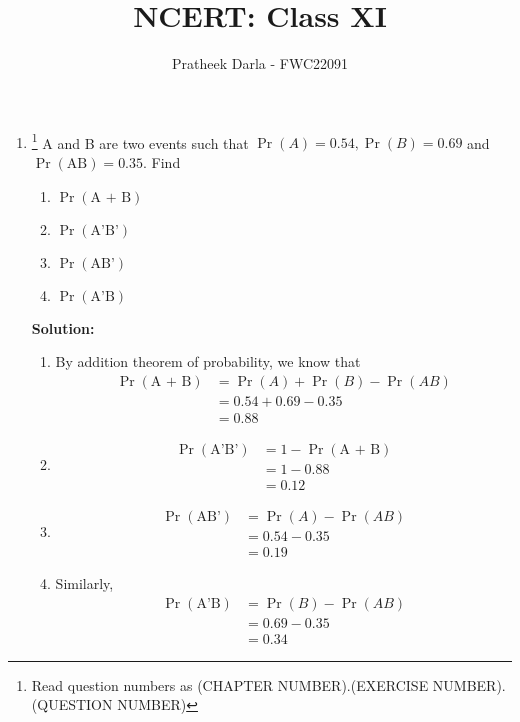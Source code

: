 \documentclass{article}
\providecommand{\pr}[1]{\ensuremath{\Pr\left(#1\right)}}
\newcommand{\solution}{\noindent \textbf{Solution: }}
\begin{document}
\title{NCERT: Class XI}
\author{\Large Pratheek Darla - FWC22091}
\date{}

\maketitle

\begin{enumerate}[label=16.\arabic{enumi}.\arabic{enumii}]%
\setcounter{enumi}{3}
\setcounter{enumii}{7}

\item \footnote{Read question numbers as (CHAPTER NUMBER).(EXERCISE NUMBER).(QUESTION NUMBER)} A and B are two events such that $\pr A=0.54, \pr B=0.69$ and  $\pr {\text{AB}} = 0.35$. Find\\[1ex]
\begin{enumerate}
\item $\pr{\text{A + B}}$ \\
\item $\pr{\text{A'B'}}$ \\
\item $\pr{\text{AB'}}$ \\
\item $\pr{\text{A'B}}$ \\[1ex]
\end{enumerate}

\solution 
\begin{enumerate}
\item By addition theorem of probability, we know that\\
\begin{align}
\pr{\text{A + B}} &= \pr A + \pr B - \pr {AB} \\
&= 0.54 + 0.69 - 0.35 \\
&= 0.88    
\end{align}

\item
\begin{align}
\pr{\text{A'B'}} &= 1 - \pr{\text{A + B}} \\
 &= 1 - 0.88 \label{eq-5}  \\
 &= 0.12
\end{align}

\item
\begin{align}
\pr{\text{AB'}} &= \pr A - \pr {AB} \\
 &= 0.54 - 0.35  \\
 &= 0.19 
\end{align}

\item Similarly, 
\begin{align}
\pr{\text{A'B}} &= \pr B - \pr {AB} \\
&= 0.69 - 0.35 \\
&= 0.34
\end{align}
\end{enumerate}      

\end{enumerate}
\end{document}

